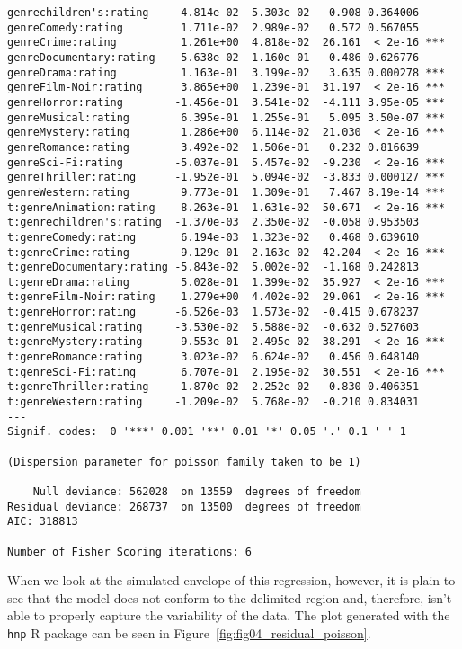 \begin{verbatim}
genrechildren's:rating    -4.814e-02  5.303e-02  -0.908 0.364006
genreComedy:rating         1.711e-02  2.989e-02   0.572 0.567055
genreCrime:rating          1.261e+00  4.818e-02  26.161  < 2e-16 ***
genreDocumentary:rating    5.638e-02  1.160e-01   0.486 0.626776
genreDrama:rating          1.163e-01  3.199e-02   3.635 0.000278 ***
genreFilm-Noir:rating      3.865e+00  1.239e-01  31.197  < 2e-16 ***
genreHorror:rating        -1.456e-01  3.541e-02  -4.111 3.95e-05 ***
genreMusical:rating        6.395e-01  1.255e-01   5.095 3.50e-07 ***
genreMystery:rating        1.286e+00  6.114e-02  21.030  < 2e-16 ***
genreRomance:rating        3.492e-02  1.506e-01   0.232 0.816639
genreSci-Fi:rating        -5.037e-01  5.457e-02  -9.230  < 2e-16 ***
genreThriller:rating      -1.952e-01  5.094e-02  -3.833 0.000127 ***
genreWestern:rating        9.773e-01  1.309e-01   7.467 8.19e-14 ***
t:genreAnimation:rating    8.263e-01  1.631e-02  50.671  < 2e-16 ***
t:genrechildren's:rating  -1.370e-03  2.350e-02  -0.058 0.953503
t:genreComedy:rating       6.194e-03  1.323e-02   0.468 0.639610
t:genreCrime:rating        9.129e-01  2.163e-02  42.204  < 2e-16 ***
t:genreDocumentary:rating -5.843e-02  5.002e-02  -1.168 0.242813
t:genreDrama:rating        5.028e-01  1.399e-02  35.927  < 2e-16 ***
t:genreFilm-Noir:rating    1.279e+00  4.402e-02  29.061  < 2e-16 ***
t:genreHorror:rating      -6.526e-03  1.573e-02  -0.415 0.678237
t:genreMusical:rating     -3.530e-02  5.588e-02  -0.632 0.527603
t:genreMystery:rating      9.553e-01  2.495e-02  38.291  < 2e-16 ***
t:genreRomance:rating      3.023e-02  6.624e-02   0.456 0.648140
t:genreSci-Fi:rating       6.707e-01  2.195e-02  30.551  < 2e-16 ***
t:genreThriller:rating    -1.870e-02  2.252e-02  -0.830 0.406351
t:genreWestern:rating     -1.209e-02  5.768e-02  -0.210 0.834031
---
Signif. codes:  0 '***' 0.001 '**' 0.01 '*' 0.05 '.' 0.1 ' ' 1

(Dispersion parameter for poisson family taken to be 1)

    Null deviance: 562028  on 13559  degrees of freedom
Residual deviance: 268737  on 13500  degrees of freedom
AIC: 318813

Number of Fisher Scoring iterations: 6
\end{verbatim}

When we look at the simulated envelope of this regression, however, it is plain
to see that the model does not conform to the delimited region and, therefore,
isn't able to properly capture the variability of the data. The plot generated
with the \verb|hnp| \citep{} R package can be seen in
Figure~\ref{fig:fig04_residual_poisson}.

